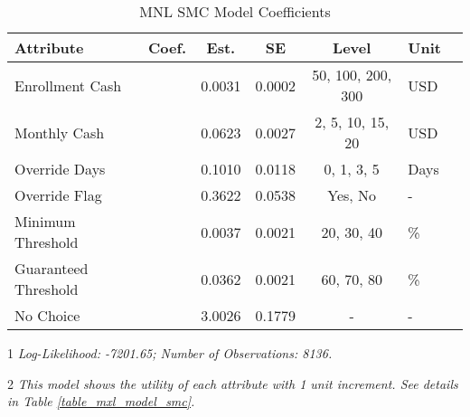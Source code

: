 \begin{table}[H]
\centering
\begin{threeparttable}
\caption{MNL SMC Model Coefficients}
\fontsize{11}{12}\selectfont
\begin{tabular}{l>{\centering\arraybackslash}p{1.5cm}ccc>{\centering\arraybackslash}p{2cm}c}
\toprule
\textbf{Attribute} & \textbf{Coef.} & \textbf{Est.} & \textbf{SE} & \textbf{Level} & \textbf{Unit}\\
\midrule
\multirow{-1}{*}{\raggedright\arraybackslash Enrollment Cash} & \multirow{-1}{1.5cm}{\centering\arraybackslash $\beta_1$} & 0.0031 & 0.0002 & 50, 100, 200, 300 & USD\\
\cmidrule(lr){1-6}
\multirow{-1}{*}{\raggedright\arraybackslash Monthly Cash} & \multirow{-1}{1.5cm}{\centering\arraybackslash $\beta_2$} & 0.0623 & 0.0027 & 2, 5, 10, 15, 20 & USD\\
\cmidrule(lr){1-6}
\multirow{-1}{*}{\raggedright\arraybackslash Override Days} & \multirow{-1}{1.5cm}{\centering\arraybackslash $\beta_3$} & 0.1010 & 0.0118 & 0, 1, 3, 5 & Days\\
\cmidrule(lr){1-6}
\multirow{-1}{*}{\raggedright\arraybackslash Override Flag} & \multirow{-1}{1.5cm}{\centering\arraybackslash $\beta_4$} & 0.3622 & 0.0538 & Yes, No & -\\
\cmidrule(lr){1-6}
\multirow{-1}{*}{\raggedright\arraybackslash Minimum Threshold} & \multirow{-1}{1.5cm}{\centering\arraybackslash $\beta_5$} & 0.0037 & 0.0021 & 20, 30, 40 & \%\\
\cmidrule(lr){1-6}
\multirow{-1}{*}{\raggedright\arraybackslash Guaranteed Threshold} & \multirow{-1}{1.5cm}{\centering\arraybackslash $\beta_6$} & 0.0362 & 0.0021 & 60, 70, 80 & \%\\
\cmidrule(lr){1-6}
\multirow{-1}{*}{\raggedright\arraybackslash No Choice} & \multirow{-1}{1.5cm}{\centering\arraybackslash $\beta_7$} & 3.0026 & 0.1779 & - & -\\
\bottomrule
\end{tabular}
\begin{tablenotes}
\small
\item [1] \textit{Log-Likelihood: -7201.65; Number of Observations: 8136.}
\item [2] \textit{This model shows the utility of each attribute with 1 unit increment. See details in Table \ref{table_mxl_model_smc}.}
\end{tablenotes}
\label{table_mnl_model_smc}
\end{threeparttable}
\end{table}
